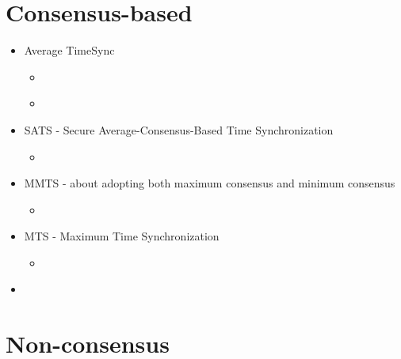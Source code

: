 \documentclass[a4paper,12pt]{article}
\begin{document}
\section{Consensus-based}

\begin{itemize}
\item Average TimeSync
  \begin{itemize}
  \item \cite{SchenatoGamba07}
  \item \cite{LucaFiorentin11}
  \end{itemize}
\end{itemize}

\begin{itemize}
\item SATS - Secure Average-Consensus-Based Time Synchronization
  \begin{itemize}
  \item \cite{HeChengShiChen13}
  \end{itemize}
\end{itemize}

\begin{itemize}
\item MMTS - about adopting both maximum consensus and minimum consensus
  \begin{itemize}
  \item \cite{HeLiChenCheng13}
  \end{itemize}
\end{itemize}

\begin{itemize}
\item MTS - Maximum Time Synchronization
  \begin{itemize}
    \item \cite{HeChengShiChen14}
  \end{itemize}
\end{itemize}

\begin{itemize}
\item 
\end{itemize}

\section{Non-consensus}
\end{document}
